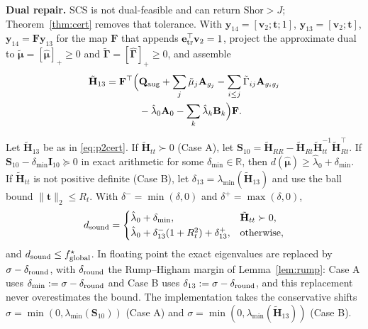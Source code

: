 \textbf{Dual repair.} SCS \cite{odonoghue2016scs} is not dual-feasible and can return $\mathrm{Shor}>J$; Theorem~\ref{thm:cert} removes that tolerance. With $\mathbf y_{14}=[\mathbf v_2;\mathbf t;1]$, $\mathbf y_{13}=[\mathbf v_2;\mathbf t]$, $\mathbf y_{14}=\mathbf F\mathbf y_{13}$ for the map $\mathbf F$ that appends $\mathbf e_{\rm tr}^\top\mathbf v_2=1$, project the approximate dual to $\tilde{\boldsymbol\mu}=[\hat{\boldsymbol\mu}]_+\ge0$ and $\tilde{\boldsymbol\Gamma}=[\hat{\boldsymbol\Gamma}]_+\ge0$, and assemble
\begin{equation}
\begin{aligned}
\tilde{\mathbf H}_{13}=\mathbf F^\top\Big(&\mathbf Q_{\rm aug}+\sum_j\tilde\mu_j\mathbf A_{g_j}-\sum_{i\le j}\tilde\Gamma_{ij}\mathbf A_{g_ig_j}\\
&-\hat\lambda_0\mathbf A_0-\sum_k\hat\lambda_k\mathbf B_k\Big)\mathbf F .
\end{aligned}
\label{eq:p2cert}
\end{equation}
\begin{theorem}\label{thm:cert}
Let $\tilde{\mathbf H}_{13}$ be as in \eqref{eq:p2cert}. If $\tilde{\mathbf H}_{tt}\succ0$ (Case A), let $\mathbf S_{10}=\tilde{\mathbf H}_{RR}-\tilde{\mathbf H}_{Rt}\tilde{\mathbf H}_{tt}^{-1}\tilde{\mathbf H}_{Rt}^\top$. If $\mathbf S_{10}-\delta_{\min}\mathbf I_{10}\succeq0$ in exact arithmetic for some $\delta_{\min}\in\mathbb{R}$, then $d(\hat{\boldsymbol\mu})\ge\hat\lambda_0+\delta_{\min}$. If $\tilde{\mathbf H}_{tt}$ is not positive definite (Case B), let $\delta_{13}=\lambda_{\min}(\tilde{\mathbf H}_{13})$ and use the ball bound $\|\mathbf t\|_2\le R_t$. With $\delta^-=\min(\delta,0)$ and $\delta^+=\max(\delta,0)$,
\begin{equation}
d_{\rm sound}=
\begin{cases}
\hat\lambda_0+\delta_{\min}, & \tilde{\mathbf H}_{tt}\succ0,\\[1pt]
\hat\lambda_0+\delta_{13}^-(1+R_t^2)+\delta_{13}^+, & \text{otherwise},
\end{cases}
\label{eq:dsound}
\end{equation}
and $d_{\rm sound}\le f^\star_{\rm global}$. In floating point the exact eigenvalues are replaced by $\sigma-\delta_{\rm round}$, with $\delta_{\rm round}$ the Rump--Higham margin of Lemma~\ref{lem:rump}: Case A uses $\delta_{\min}:=\sigma-\delta_{\rm round}$ and Case B uses $\delta_{13}:=\sigma-\delta_{\rm round}$, and this replacement never overestimates the bound. The implementation takes the conservative shifts $\sigma=\min(0,\lambda_{\min}(\mathbf S_{10}))$ (Case A) and $\sigma=\min(0,\lambda_{\min}(\tilde{\mathbf H}_{13}))$ (Case B).
\end{theorem}
